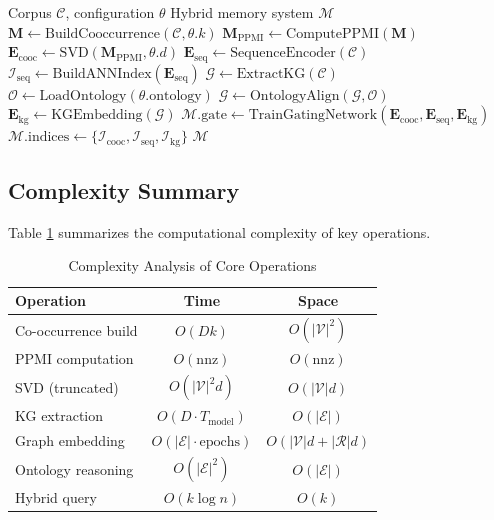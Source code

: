 \documentclass[conference]{IEEEtran}
\begin{document}
\begin{algorithm}
\caption{Second Brain Integration Pipeline}
\begin{algorithmic}[1]
\REQUIRE Corpus $\mathcal{C}$, configuration $\theta$
\ENSURE Hybrid memory system $\mathcal{M}$
\STATE {}
\STATE $\mathbf{M} \leftarrow \text{BuildCooccurrence}(\mathcal{C}, \theta.k)$
\STATE $\mathbf{M}_{\text{PPMI}} \leftarrow \text{ComputePPMI}(\mathbf{M})$
\STATE $\mathbf{E}_{\text{cooc}} \leftarrow \text{SVD}(\mathbf{M}_{\text{PPMI}}, \theta.d)$
\STATE {}
\STATE $\mathbf{E}_{\text{seq}} \leftarrow \text{SequenceEncoder}(\mathcal{C})$
\STATE $\mathcal{I}_{\text{seq}} \leftarrow \text{BuildANNIndex}(\mathbf{E}_{\text{seq}})$
\STATE {}
\STATE $\mathcal{G} \leftarrow \text{ExtractKG}(\mathcal{C})$
\STATE $\mathcal{O} \leftarrow \text{LoadOntology}(\theta.\text{ontology})$
\STATE $\mathcal{G} \leftarrow \text{OntologyAlign}(\mathcal{G}, \mathcal{O})$
\STATE $\mathbf{E}_{\text{kg}} \leftarrow \text{KGEmbedding}(\mathcal{G})$
\STATE {}
\STATE $\mathcal{M}.\text{gate} \leftarrow \text{TrainGatingNetwork}(\mathbf{E}_{\text{cooc}}, \mathbf{E}_{\text{seq}}, \mathbf{E}_{\text{kg}})$
\STATE $\mathcal{M}.\text{indices} \leftarrow \{\mathcal{I}_{\text{cooc}}, \mathcal{I}_{\text{seq}}, \mathcal{I}_{\text{kg}}\}$
\RETURN $\mathcal{M}$
\end{algorithmic}
\end{algorithm}

\subsection{Complexity Summary}

Table \ref{tab:complexity} summarizes the computational complexity of key operations.

\begin{table}[h]
\centering
\caption{Complexity Analysis of Core Operations}
\label{tab:complexity}
\begin{tabular}{lcc}
\toprule
\textbf{Operation} & \textbf{Time} & \textbf{Space} \\
\midrule
Co-occurrence build & $O(Dk)$ & $O(|\mathcal{V}|^2)$ \\
PPMI computation & $O(\text{nnz})$ & $O(\text{nnz})$ \\
SVD (truncated) & $O(|\mathcal{V}|^2 d)$ & $O(|\mathcal{V}| d)$ \\
KG extraction & $O(D \cdot T_{\text{model}})$ & $O(|\mathcal{E}|)$ \\
Graph embedding & $O(|\mathcal{E}| \cdot \text{epochs})$ & $O(|\mathcal{V}|d + |\mathcal{R}|d)$ \\
Ontology reasoning & $O(|\mathcal{E}|^2)$ & $O(|\mathcal{E}|)$ \\
Hybrid query & $O(k \log n)$ & $O(k)$ \\
\bottomrule
\end{tabular}
\end{table}
\end{document}
